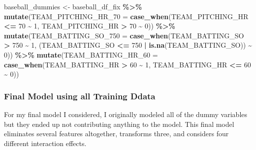\documentclass[
]{article}
\newenvironment{Shaded}{\begin{snugshade}}{\end{snugshade}}
\newcommand{\DataTypeTok}[1]{\textcolor[rgb]{0.13,0.29,0.53}{#1}}
\newcommand{\DecValTok}[1]{\textcolor[rgb]{0.00,0.00,0.81}{#1}}
\newcommand{\KeywordTok}[1]{\textcolor[rgb]{0.13,0.29,0.53}{\textbf{#1}}}
\newcommand{\NormalTok}[1]{#1}
\newcommand{\OperatorTok}[1]{\textcolor[rgb]{0.81,0.36,0.00}{\textbf{#1}}}
\newcommand{\StringTok}[1]{\textcolor[rgb]{0.31,0.60,0.02}{#1}}
\begin{document}
\begin{Shaded}
\begin{Highlighting}[]
\NormalTok{baseball\_dummies \textless{}{-}}\StringTok{ }\NormalTok{baseball\_df\_fix }\OperatorTok{\%\textgreater{}\%}
\StringTok{  }\KeywordTok{mutate}\NormalTok{(}\DataTypeTok{TEAM\_PITCHING\_HR\_70 =} \KeywordTok{case\_when}\NormalTok{(TEAM\_PITCHING\_HR }\OperatorTok{\textless{}=}\StringTok{ }\DecValTok{70} \OperatorTok{\textasciitilde{}}\StringTok{ }\DecValTok{1}\NormalTok{, TEAM\_PITCHING\_HR }\OperatorTok{\textgreater{}}\StringTok{ }\DecValTok{70} \OperatorTok{\textasciitilde{}}\StringTok{ }\DecValTok{0}\NormalTok{)) }\OperatorTok{\%\textgreater{}\%}
\StringTok{  }\KeywordTok{mutate}\NormalTok{(}\DataTypeTok{TEAM\_BATTING\_SO\_750 =} \KeywordTok{case\_when}\NormalTok{(TEAM\_BATTING\_SO  }\OperatorTok{\textgreater{}}\StringTok{ }\DecValTok{750} \OperatorTok{\textasciitilde{}}\StringTok{ }\DecValTok{1}\NormalTok{, (TEAM\_BATTING\_SO  }\OperatorTok{\textless{}=}\StringTok{ }\DecValTok{750} \OperatorTok{|}\StringTok{ }\KeywordTok{is.na}\NormalTok{(TEAM\_BATTING\_SO)) }\OperatorTok{\textasciitilde{}}\StringTok{ }\DecValTok{0}\NormalTok{)) }\OperatorTok{\%\textgreater{}\%}
\StringTok{  }\KeywordTok{mutate}\NormalTok{(}\DataTypeTok{TEAM\_BATTING\_HR\_60 =} \KeywordTok{case\_when}\NormalTok{(TEAM\_BATTING\_HR  }\OperatorTok{\textgreater{}}\StringTok{ }\DecValTok{60} \OperatorTok{\textasciitilde{}}\StringTok{ }\DecValTok{1}\NormalTok{, TEAM\_BATTING\_HR  }\OperatorTok{\textless{}=}\StringTok{ }\DecValTok{60} \OperatorTok{\textasciitilde{}}\StringTok{ }\DecValTok{0}\NormalTok{))}
\end{Highlighting}
\end{Shaded}

\hypertarget{final-model-using-all-training-ddata}{%
\subsubsection{Final Model using all Training
Ddata}\label{final-model-using-all-training-ddata}}

For my final model I considered, I originally modeled all of the dummy
variables but they ended up not contributing anything to the model. This
final model eliminates several features altogether, transforms three,
and considers four different interaction effects.
\end{document}
